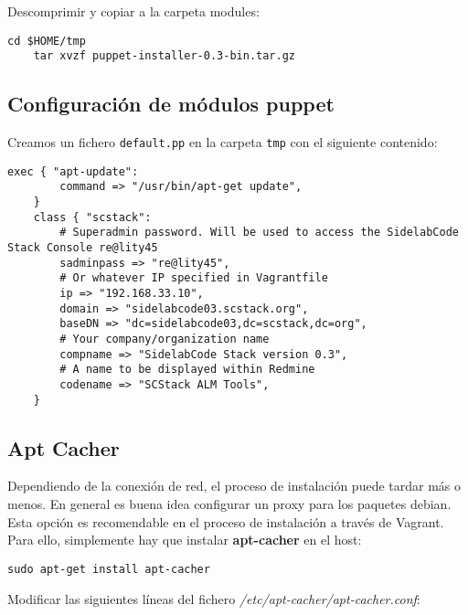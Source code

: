 \par Descomprimir y copiar a la carpeta modules:

\lstset{style=rubybasico}
\begin{lstlisting}[frame=trbl]
    cd $HOME/tmp
    tar xvzf puppet-installer-0.3-bin.tar.gz
\end{lstlisting}

\subsection{Configuración de módulos puppet}
\label{sub:conf-modulos-puppet}

\par Creamos un fichero \texttt{default.pp} en la carpeta \texttt{tmp} con el siguiente contenido:

\lstset{style=rubybasico}
\begin{lstlisting}[frame=trbl]
    exec { "apt-update":
        command => "/usr/bin/apt-get update",
    }
    class { "scstack":
        # Superadmin password. Will be used to access the SidelabCode Stack Console re@lity45
        sadminpass => "re@lity45",
        # Or whatever IP specified in Vagrantfile
        ip => "192.168.33.10", 
        domain => "sidelabcode03.scstack.org",
        baseDN => "dc=sidelabcode03,dc=scstack,dc=org",
        # Your company/organization name
        compname => "SidelabCode Stack version 0.3",
        # A name to be displayed within Redmine
        codename => "SCStack ALM Tools",
    }
\end{lstlisting}

\subsection{Apt Cacher}
\label{sub:apt-cacher}

\par Dependiendo de la conexión de red, el proceso de instalación puede tardar más o menos. En general es buena idea configurar un proxy para los paquetes debian. Esta opción es recomendable en el proceso de instalación a través de Vagrant. Para ello, simplemente hay que instalar \textbf{apt-cacher} en el host:

\lstset{style=rubybasico}
\begin{lstlisting}[frame=trbl]
    sudo apt-get install apt-cacher
\end{lstlisting}

\par Modificar las siguientes líneas del fichero \emph{/etc/apt-cacher/apt-cacher.conf}:

